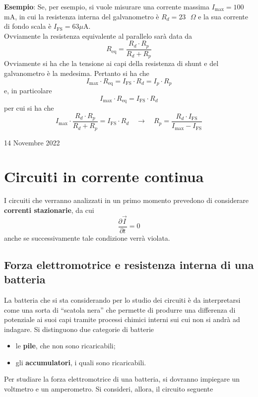 \documentclass[a4paper]{extarticle}
\newcommand{\quotes}[1]{``#1''}
\begin{document}
\vspace{1em}
\noindent
\textbf{Esempio}: Se, per esempio, si vuole misurare una corrente massima $I_\text{max} = 100$ mA, in cui la resistenza interna del galvanometro è $R_d=23 \text{ } \Omega$ e la sua corrente di fondo scala è $I_\text{FS} = 63 \text{} \mu$A.\\
Ovviamente la resistenza equivalente al parallelo sarà data da
\[R_\text{eq} = \dfrac{R_d \cdot R_p}{R_d + R_p}\]
Ovviamente si ha che la tensione ai capi della resistenza di shunt e del galvanometro è la medesima. Pertanto si ha che
\[I_{\max} \cdot R_\text{eq} = I_\text{FS} \cdot R_d = I_p \cdot R_p\]
e, in particolare
\[I_{\max} \cdot R_\text{eq} = I_\text{FS} \cdot R_d\]
per cui si ha che
\[I_{\max} \cdot \dfrac{R_d \cdot R_p}{R_d + R_p} = I_\text{FS} \cdot R_d \hspace{1em} \rightarrow \hspace{1em} R_p = \dfrac{R_d \cdot I_\text{FS}}{I_{\max} - I_\text{FS}}\]

\newpage
\noindent
\begin{center}
  14 Novembre 2022
\end{center}
\section{Circuiti in corrente continua}
I circuiti che verranno analizzati in un primo momento prevedono di considerare \textbf{correnti stazionarie}, da cui
\[\dfrac{\partial \vec I}{\partial t} = 0\]
anche se successivamente tale condizione verrà violata.

\vspace{1em}
\noindent
\subsection{Forza elettromotrice e resistenza interna di una batteria}
La batteria che si sta considerando per lo studio dei circuiti è da interpretarsi come una sorta di \quotes{scatola nera} che permette di produrre una differenza di potenziale ai suoi capi tramite processi chimici interni sui cui non si andrà ad indagare. Si distinguono due categorie di batterie
\begin{itemize}
  \item le \textbf{pile}, che non sono ricaricabili;
  \item gli \textbf{accumulatori}, i quali sono ricaricabili.
\end{itemize}
Per studiare la forza elettromotrice di una batteria, si dovranno impiegare un voltmetro e un amperometro. Si consideri, allora, il circuito seguente
\end{document}
